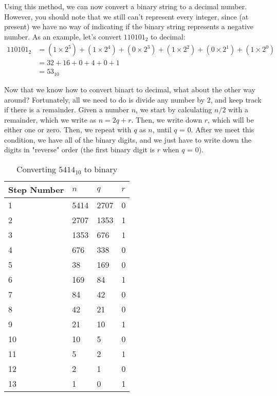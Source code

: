 \documentclass[11pt]{article}
\begin{document}
Using this method, we can now convert a binary string to a decimal number. However, you should note that we still can't represent every integer, since (at present) we have no way of indicating if the binary string represents a negative number.
As an example, let's convert $110101_2$ to decimal:
\begin{align*}
    110101_2 &= ( 1\times 2 ^{5} ) + ( 1\times 2 ^{4} ) + ( 0\times 2 ^{3} ) + ( 1\times 2 ^{2} ) + (0 \times 2 ^{1} ) + (1 \times 2 ^{0} )\\
             &= 32 + 16 + 0 + 4 + 0 + 1\\
             &= 53_{10}
\end{align*}

\newpage
Now that we know how to convert binart to decimal, what about the other way around? Fortunately, all we need to do is divide any number by 2, and keep track if there is a remainder.
Given a number $n$, we start by calculating $n / 2$ with a remainder, which we write as $n = 2q + r$. Then, we write down $r$, which will be either one or zero. 
Then, we repeat with $q$ as $n$, until $q$ = 0.
After we meet this condition, we have all of the binary digits, and we just have to write down the digits in "reverse" order (the first binary digit is $r$ when $q$ = 0).

\begin{table}[h!]
    \centering
    \begin{tabular}{|l|l|l|l|}
    \hline
    Step Number & $n$  & $q$  & $r$ \\ \hline
    1           & 5414 & 2707 & 0   \\ \hline
    2           & 2707 & 1353 & 1   \\ \hline
    3           & 1353 & 676  & 1   \\ \hline
    4           & 676  & 338  & 0   \\ \hline
    5           & 38   & 169  & 0   \\ \hline
    6           & 169  & 84   & 1   \\ \hline
    7           & 84   & 42   & 0   \\ \hline
    8           & 42   & 21   & 0   \\ \hline
    9           & 21   & 10   & 1   \\ \hline
    10          & 10   & 5    & 0   \\ \hline
    11          & 5    & 2    & 1   \\ \hline
    12          & 2    & 1    & 0   \\ \hline
    13          & 1    & 0    & 1   \\ \hline
    \end{tabular}
    \caption{Converting $5414_{10}$ to binary}
\end{table}
\end{document}
